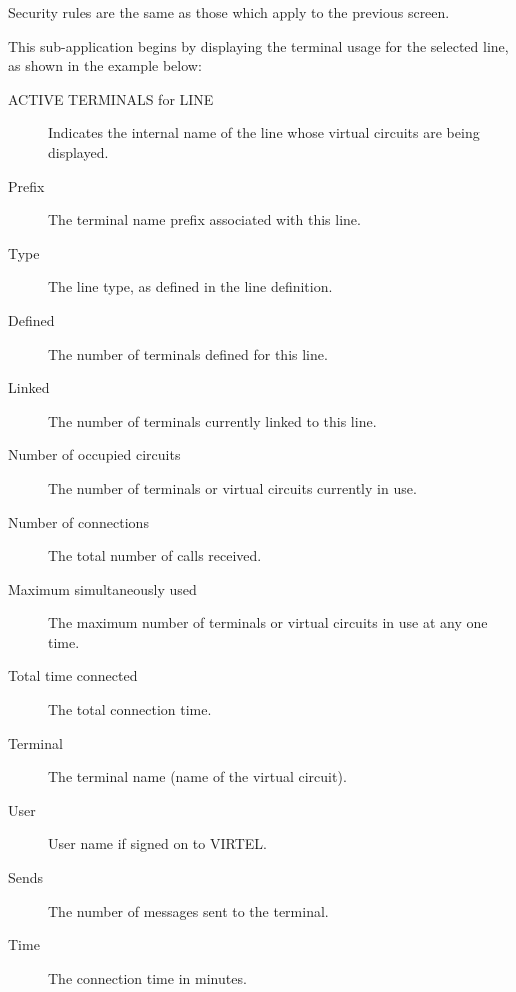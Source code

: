 \documentclass[letterpaper,10pt,english]{sphinxmanual}
\begin{document}
Security rules are the same as those which apply to the previous screen.

This sub-application begins by displaying the terminal usage for the selected line, as shown in the example below:


\begin{description}
\item[{ACTIVE TERMINALS for LINE}] \leavevmode
Indicates the internal name of the line whose virtual circuits are being displayed.

\item[{Prefix}] \leavevmode
The terminal name prefix associated with this line.

\item[{Type}] \leavevmode
The line type, as defined in the line definition.

\item[{Defined}] \leavevmode
The number of terminals defined for this line.

\item[{Linked}] \leavevmode
The number of terminals currently linked to this line.

\item[{Number of occupied circuits}] \leavevmode
The number of terminals or virtual circuits currently in use.

\item[{Number of connections}] \leavevmode
The total number of calls received.

\item[{Maximum simultaneously used}] \leavevmode
The maximum number of terminals or virtual circuits in use at any one time.

\item[{Total time connected}] \leavevmode
The total connection time.

\item[{Terminal}] \leavevmode
The terminal name (name of the virtual circuit).

\item[{User}] \leavevmode
User name if signed on to VIRTEL.

\item[{Sends}] \leavevmode
The number of messages sent to the terminal.

\item[{Time}] \leavevmode
The connection time in minutes.


\end{description}
\end{document}
